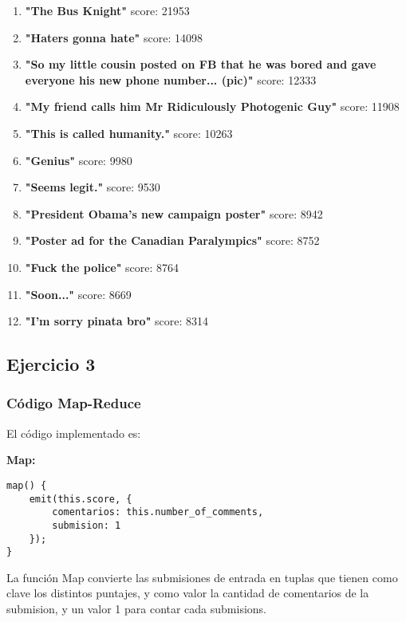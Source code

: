 \begin{enumerate}

\item \textbf{"The Bus Knight"} score: 21953
\item \textbf{"Haters gonna hate"} score: 14098
\item  \textbf{"So my little cousin posted on FB that he was bored and gave everyone his new phone number... (pic)"} score: 12333
\item \textbf{"My friend calls him Mr Ridiculously Photogenic Guy"} score: 11908
\item \textbf{"This is called humanity."} score: 10263
\item \textbf{"Genius"} score: 9980
\item \textbf{"Seems legit."} score: 9530
\item \textbf{"President Obama's new campaign poster"} score: 8942
\item\textbf{"Poster ad for the Canadian Paralympics"} score: 8752
\item \textbf{"Fuck the police"} score: 8764
\item \textbf{"Soon..."} score: 8669
\item \textbf{"I'm sorry pinata bro"} score: 8314

\end{enumerate}

\subsection{Ejercicio 3}

\subsubsection{C\'odigo Map-Reduce}

El c\'odigo implementado es:

\textbf{Map:}

\begin{lstlisting}
map() {
    emit(this.score, {
    	comentarios: this.number_of_comments,
    	submision: 1
    });
}
\end{lstlisting}

\vspace{2mm}

La funci\'on Map convierte las submisiones de entrada en tuplas que tienen como clave los distintos puntajes, y como valor la cantidad de comentarios de la submision, y un valor 1 para contar cada submisions.

